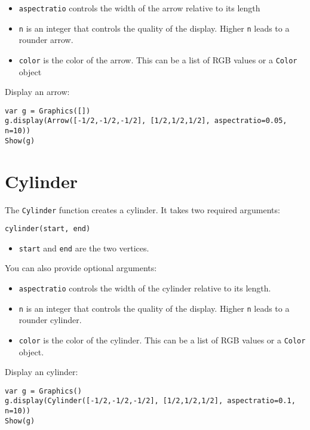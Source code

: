 \begin{itemize}

\item
  \texttt{aspectratio} controls the width of the arrow relative to its
  length
\item
  \texttt{n} is an integer that controls the quality of the display.
  Higher \texttt{n} leads to a rounder arrow.
\item
  \texttt{color} is the color of the arrow. This can be a list of RGB
  values or a \texttt{Color} object
\end{itemize}

Display an arrow:

\begin{lstlisting}
var g = Graphics([])
g.display(Arrow([-1/2,-1/2,-1/2], [1/2,1/2,1/2], aspectratio=0.05, n=10))
Show(g)
\end{lstlisting}

\hypertarget{cylinder}{%
\section{Cylinder}\label{cylinder}}

The \texttt{Cylinder} function creates a cylinder. It takes two required
arguments:

\begin{lstlisting}
cylinder(start, end)
\end{lstlisting}

\begin{itemize}

\item
  \texttt{start} and \texttt{end} are the two vertices.
\end{itemize}

You can also provide optional arguments:

\begin{itemize}

\item
  \texttt{aspectratio} controls the width of the cylinder relative to
  its length.
\item
  \texttt{n} is an integer that controls the quality of the display.
  Higher \texttt{n} leads to a rounder cylinder.
\item
  \texttt{color} is the color of the cylinder. This can be a list of RGB
  values or a \texttt{Color} object.
\end{itemize}

Display an cylinder:

\begin{lstlisting}
var g = Graphics()
g.display(Cylinder([-1/2,-1/2,-1/2], [1/2,1/2,1/2], aspectratio=0.1, n=10))
Show(g)
\end{lstlisting}

